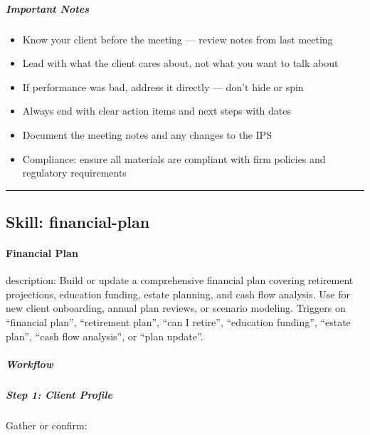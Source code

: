 \documentclass[11pt]{article}
\begin{document}
\subparagraph{Important Notes}\mbox{}\par

\begin{itemize}[leftmargin=*,itemsep=2pt,topsep=2pt]
\item {} Know your client before the meeting — review notes from last meeting
\item {} Lead with what the client cares about, not what you want to talk about
\item {} If performance was bad, address it directly — don't hide or spin
\item {} Always end with clear action items and next steps with dates
\item {} Document the meeting notes and any changes to the IPS
\item {} Compliance: ensure all materials are compliant with firm policies and regulatory requirements
\end{itemize}

\vspace{0.8em}\hrule\vspace{0.8em}

\subsection{Skill: financial-plan}\label{file:skills-financial-plan-SKILL.md}

\paragraph{Financial Plan}\mbox{}\par

description: Build or update a comprehensive financial plan covering retirement projections, education funding, estate planning, and cash flow analysis. Use for new client onboarding, annual plan reviews, or scenario modeling. Triggers on ``financial plan'', ``retirement plan'', ``can I retire'', ``education funding'', ``estate plan'', ``cash flow analysis'', or ``plan update''.


\subparagraph{Workflow}\mbox{}\par

\subparagraph{Step 1: Client Profile}\mbox{}\par

Gather or confirm:
\end{document}
